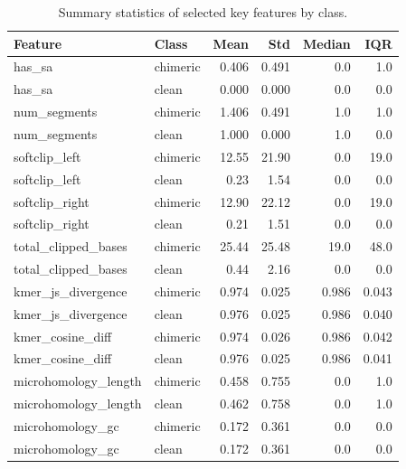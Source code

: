 \begin{table}[H]
\centering
\caption{Summary statistics of selected key features by class.}
\label{tab:key_feature_summary}
\begin{tabular}{llrrrr}
\toprule
Feature & Class & Mean & Std & Median & IQR \\
\midrule
has\_sa & chimeric & 0.406 & 0.491 & 0.0 & 1.0 \\
has\_sa & clean    & 0.000 & 0.000 & 0.0 & 0.0 \\

num\_segments & chimeric & 1.406 & 0.491 & 1.0 & 1.0 \\
num\_segments & clean    & 1.000 & 0.000 & 1.0 & 0.0 \\

softclip\_left & chimeric & 12.55 & 21.90 & 0.0 & 19.0 \\
softclip\_left & clean    & 0.23  & 1.54  & 0.0 & 0.0  \\

softclip\_right & chimeric & 12.90 & 22.12 & 0.0 & 19.0 \\
softclip\_right & clean    & 0.21  & 1.51  & 0.0 & 0.0  \\

total\_clipped\_bases & chimeric & 25.44 & 25.48 & 19.0 & 48.0 \\
total\_clipped\_bases & clean    & 0.44  & 2.16  & 0.0  & 0.0  \\

kmer\_js\_divergence & chimeric & 0.974 & 0.025 & 0.986 & 0.043 \\
kmer\_js\_divergence & clean    & 0.976 & 0.025 & 0.986 & 0.040 \\

kmer\_cosine\_diff & chimeric & 0.974 & 0.026 & 0.986 & 0.042 \\
kmer\_cosine\_diff & clean    & 0.976 & 0.025 & 0.986 & 0.041 \\

microhomology\_length & chimeric & 0.458 & 0.755 & 0.0 & 1.0 \\
microhomology\_length & clean    & 0.462 & 0.758 & 0.0 & 1.0 \\

microhomology\_gc  & chimeric & 0.172 & 0.361 & 0.0    & 0.0    \\
microhomology\_gc  & clean    & 0.172 & 0.361 & 0.0    & 0.0    \\
\bottomrule
\end{tabular}
\end{table}

